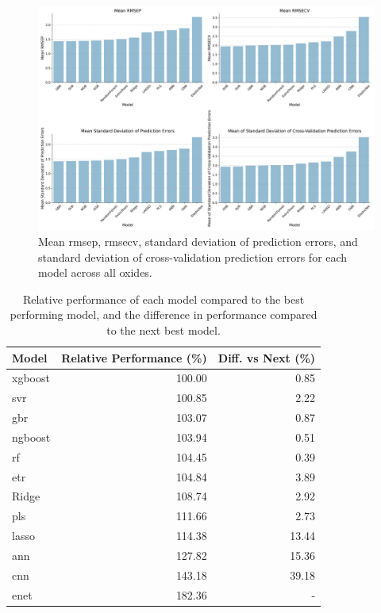 
\begin{figure}[h]
    \centering
    \includegraphics[width=\textwidth]{images/init_results_means.png}
    \caption{Mean \gls{rmsep}, \gls{rmsecv}, standard deviation of prediction errors, and standard deviation of cross-validation prediction errors for each model across all oxides.}
    \label{fig:init_results_rmses}
\end{figure}

\begin{table}[ht]
\centering
\begin{tabularx}{\linewidth}{lrr}
\toprule
Model & Relative Performance (\%) & Diff. vs Next (\%) \\
\midrule
\gls{xgboost} & 100.00 & 0.85 \\
\gls{svr} & 100.85 & 2.22 \\
\gls{gbr} & 103.07 & 0.87 \\
\gls{ngboost} & 103.94 & 0.51 \\
\gls{rf} & 104.45 & 0.39 \\
\gls{etr} & 104.84 & 3.89 \\
Ridge & 108.74 & 2.92 \\
\gls{pls} & 111.66 & 2.73 \\
\gls{lasso} & 114.38 & 13.44 \\
\gls{ann} & 127.82 & 15.36 \\
\gls{cnn} & 143.18 & 39.18 \\
\gls{enet} & 182.36 & - \\
\bottomrule
\end{tabularx}
\caption{Relative performance of each model compared to the best performing model, and the difference in performance compared to the next best model.}
\label{tab:relative_performance}
\end{table}

